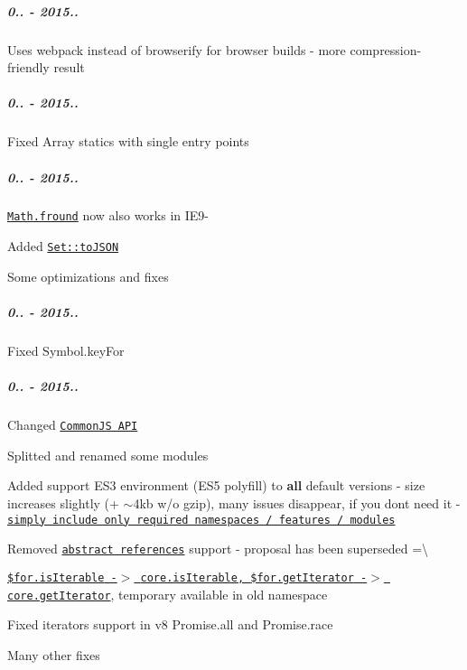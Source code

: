 \subparagraph*{0.. -\/ 2015..}


\begin{DoxyItemize}
\item Uses {\ttfamily webpack} instead of {\ttfamily browserify} for browser builds -\/ more compression-\/friendly result
\end{DoxyItemize}

\subparagraph*{0.. -\/ 2015..}


\begin{DoxyItemize}
\item Fixed {\ttfamily Array} statics with single entry points
\end{DoxyItemize}

\subparagraph*{0.. -\/ 2015..}


\begin{DoxyItemize}
\item \href{https://github.com/zloirock/core-js/#ecmascript-6-math}{\tt {\ttfamily Math.\+fround}} now also works in I\+E9-\/
\item Added \href{https://github.com/zloirock/core-js/#ecmascript-7-proposals}{\tt {\ttfamily Set\+::to\+J\+S\+ON}}
\item Some optimizations and fixes
\end{DoxyItemize}

\subparagraph*{0.. -\/ 2015..}


\begin{DoxyItemize}
\item Fixed {\ttfamily Symbol.\+key\+For}
\end{DoxyItemize}

\subparagraph*{0.. -\/ 2015..}


\begin{DoxyItemize}
\item Changed \href{https://github.com/zloirock/core-js/#commonjs}{\tt Common\+JS A\+PI}
\item Splitted and renamed some modules
\item Added support E\+S3 environment (E\+S5 polyfill) to {\bfseries all} default versions -\/ size increases slightly (+ $\sim$4kb w/o gzip), many issues disappear, if you don\textquotesingle{}t need it -\/ \href{https://github.com/zloirock/core-js/#commonjs}{\tt simply include only required namespaces / features / modules}
\item Removed \href{https://github.com/zenparsing/es-abstract-refs}{\tt abstract references} support -\/ proposal has been superseded =\textbackslash{}
\item \href{https://github.com/zloirock/core-js/#ecmascript-6-iterators}{\tt {\ttfamily \$for.\+is\+Iterable} -\/$>$ {\ttfamily core.\+is\+Iterable}, {\ttfamily \$for.\+get\+Iterator} -\/$>$ {\ttfamily core.\+get\+Iterator}}, temporary available in old namespace
\item Fixed iterators support in v8 {\ttfamily Promise.\+all} and {\ttfamily Promise.\+race}
\item Many other fixes
\end{DoxyItemize}

